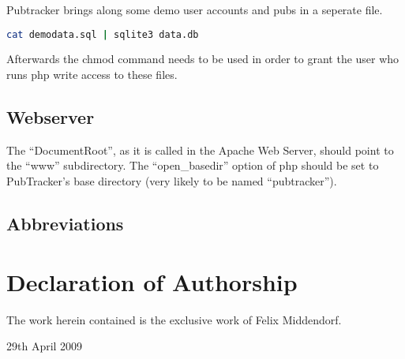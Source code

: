 \documentclass[a4paper,10pt]{scrartcl}
\begin{document}
Pubtracker brings along some demo user accounts and pubs in a seperate file.

\begin{lstlisting}[language=bash]
cat demodata.sql | sqlite3 data.db
\end{lstlisting}

Afterwards the chmod command needs to be used in order to grant the user who
runs php write access to these files.

\subsection{Webserver}
The ``DocumentRoot'', as it is called in the Apache Web Server, should point to
the ``www'' subdirectory. The ``open\_basedir'' option of php should be set to
PubTracker's base directory (very likely to be named ``pubtracker'').

\begin{appendix}
\clearpage
{}
{}



\section{Abbreviations}
\begin{acronym}
\end{acronym}
\end{appendix}

\section{Declaration of Authorship}
The work herein contained is the exclusive work of Felix Middendorf.

29th April 2009
\end{document}
